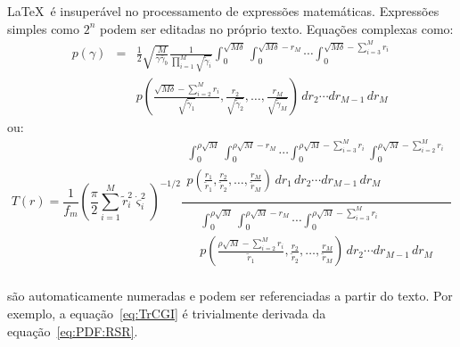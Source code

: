 
\label{Cap:matematica}

\LaTeX~é insuperável no processamento de expressões matemáticas. Expressões
simples como $2^{n}$ podem ser editadas no próprio texto. Equações
complexas como:
\begin{eqnarray} \label{eq:PDF:RSR}
  p \left( \gamma \right) & = & \frac{1}{2} \sqrt{\frac{M}{\gamma \bar{\gamma}_{b}}} \frac{1}{ \prod_{i=1}^M {\sqrt{\tilde{\gamma}_i}}}
  \int_0^{\sqrt{M \delta}} \int_0^{\sqrt{M \delta} - r_M } \cdots
  \int_0^{\sqrt{M \delta} - \sum_{i = 3}^M {r_i } } \nonumber \\
  & & p \left( {\frac{\sqrt{M \delta} - \sum_{i = 2}^M {r_i }}{\sqrt{\tilde{\gamma}_1}} ,
  \frac{r_2}{\sqrt{\tilde{\gamma}_2}} , \ldots ,\frac{r_M}{\sqrt{\tilde{\gamma}_M}} } \right)
  \, dr_2 \cdots dr_{M-1} \, dr_M
\end{eqnarray}
ou:
\begin{equation} \label{eq:TrCGI}
  T(r) = \frac{1}{f_m}
  \left( \frac{\pi}{2} \sum_{i=1}^M
  {\tilde{r}_i^2 \dot{\varsigma}_i^2}\right)^{-1/2}
  \frac
  {\begin{array}{ll}
  \int_0^{\rho \sqrt{M}} \int_0^{\rho \sqrt{M} - r_M } \cdots
  \int_0^{\rho \sqrt{M} - \sum_{i = 3}^M {r_i } } \int_0^{\rho \sqrt{M} -
  \sum_{i = 2}^M {r_i } }  \\
  p \left( {\frac{r_1}{\tilde{r}_1} ,
  \frac{r_2}{\tilde{r}_2} , \ldots ,\frac{r_M}{\tilde{r}_M} } \right)
  \, dr_1 \, dr_2 \cdots dr_{M-1} \, dr_M \\ \end{array}}
  {\begin{array}{ll}
  \int_0^{\rho \sqrt{M}} \int_0^{\rho \sqrt{M} - r_M } \cdots
  \int_0^{\rho \sqrt{M} - \sum_{i = 3}^M {r_i } } \\
  p \left( {\frac{\rho \sqrt{M} - \sum_{i = 2}^M {r_i }}{\tilde{r}_1} ,
  \frac{r_2}{\tilde{r}_2} , \ldots ,\frac{r_M}{\tilde{r}_M} } \right)
  \, dr_2 \cdots dr_{M-1} \, dr_M \\ \end{array}}
\end{equation}

são automaticamente numeradas e podem ser referenciadas a partir do
texto. Por exemplo, a equação~\ref{eq:TrCGI} é trivialmente derivada
da equação~\ref{eq:PDF:RSR}.

